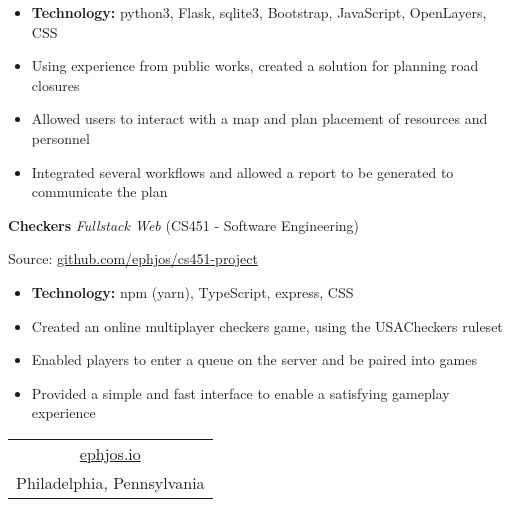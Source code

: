 \documentclass[10pt]{article}
\begin{document}
\vspace{-\topsep}
\begin{itemize}
    \setlength\itemsep{-0.5em}
    \item \textbf{Technology:} python3, Flask, sqlite3, Bootstrap,
        JavaScript, OpenLayers, CSS
    \item Using experience from public works, created a solution for
        planning road closures
    \item Allowed users to interact with a map and plan placement of
        resources and personnel
    \item Integrated several workflows and allowed a report to be generated
        to communicate the plan
\end{itemize}

\vspace{-0.75em}
\textbf{Checkers}
\emph{Fullstack Web}
(CS451 - Software Engineering)

\indent \indent Source:
\href{https://github.com/ephjos/cs451-project}
{github.com/ephjos/cs451-project}

\vspace{-\topsep}
\begin{itemize}
    \setlength\itemsep{-0.5em}
    \item \textbf{Technology:} npm (yarn), TypeScript, express, CSS
    \item Created an online multiplayer checkers game, using the
        USACheckers ruleset
    \item Enabled players to enter a queue on the server and be paired
        into games
    \item Provided a simple and fast interface to enable a satisfying
        gameplay experience
\end{itemize}

\hrulefill

\begin{center}
    \begin{tabular}{c}
        \href{http://ephjos.io}{ephjos.io} \\
        Philadelphia, Pennsylvania \\
    \end{tabular}
\end{center}
\end{document}
